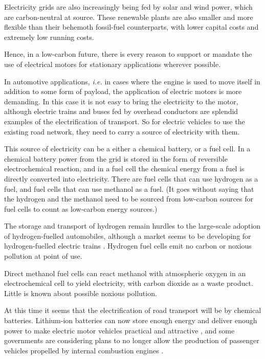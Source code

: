 Electricity grids are also increasingly being fed by solar and wind power,
which are carbon-neutral at source. These renewable plants are also smaller and
more flexible than their behemoth fossil-fuel counterparts, with lower capital
costs and extremely low running costs.

Hence, in a low-carbon future, there is every reason to support or mandate the
use of electrical motors for stationary applications wherever possible.

In automotive applications, \textit{i.e.} in cases where the engine is used to
move itself in addition to some form of payload, the application of electric
motors is more demanding. In this case it is not easy to bring the electricity
to the motor, although electric trains and buses fed by overhead conductors are
splendid examples of the electrification of transport. So for electric vehicles
to use the existing road network, they need to carry a source of electricity
with them.

This source of electricity can be a either a chemical battery, or a fuel cell.
In a chemical battery power from the grid is stored in the form of reversible
electrochemical reaction, and in a fuel cell the chemical energy from a fuel is
directly converted into electricity. There are fuel cells that can use hydrogen
as a fuel, and fuel cells that can use methanol as a fuel. (It goes without
saying that the hydrogen and the methanol need to be sourced from low-carbon
sources for fuel cells to count as low-carbon energy sources.)

The storage and transport of hydrogen remain hurdles to the large-scale adoption
of hydrogen-fuelled automobiles, although a market seems to be developing for
hydrogen-fuelled electric trains \autocite{theguardian_2018}. Hydrogen fuel cells
emit no carbon or noxious pollution at point of use.

Direct methanol fuel cells can react methanol with atmospheric oxygen in an
electrochemical cell to yield electricity, with carbon dioxide
as a waste product. Little is known about possible noxious pollution.

At this time it seems that the electrification of road transport will be by
chemical batteries. Lithium-ion batteries can now store enough energy and
deliver enough power to make electric motor vehicles practical and
attractive \autocite{Hayes2011}, and some governments are considering plans to no
longer allow the production of passenger vehicles propelled by internal
combustion engines \autocite{Burke-Kennedy2018} \autocite{Reuters2018}
\autocite{Gabbatiss2018}.

